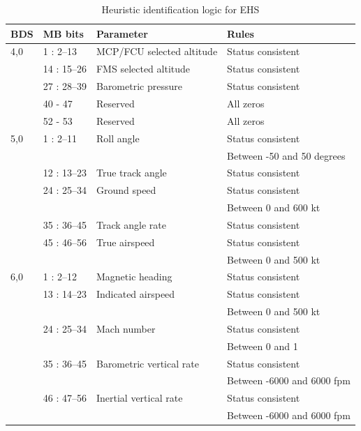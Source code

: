 \begin{table}
\footnotesize
\centering
\small
\caption{Heuristic identification logic for EHS}
\label{tb:bds_rule_ehs}
\begin{tabular}{|l|l|l|l|}
\hline
\textbf{BDS} & \textbf{MB bits} & \textbf{Parameter} & \textbf{Rules} \\ \hline \hline
4,0 & 1 : 2--13 & MCP/FCU selected altitude & Status consistent \\ \cline{2-4} 
& 14 : 15--26 & FMS selected altitude & Status consistent \\ \cline{2-4} 
& 27 : 28--39 & Barometric pressure & Status consistent \\ \cline{2-4} 
& 40 - 47 & Reserved & All zeros \\ \cline{2-4} 
& 52 - 53 & Reserved & All zeros \\ \hline \hline
5,0 & 1 : 2--11 & Roll angle & Status consistent \\ 
& & & Between -50 and 50 degrees \\ \cline{2-4} 
& 12 : 13--23 & True track angle & Status consistent \\ \cline{2-4} 
& 24 : 25--34 & Ground speed & Status consistent \\ 
& & & Between 0 and 600 kt \\ \cline{2-4} 
& 35 : 36--45 & Track angle rate & Status consistent \\ \cline{2-4} 
& 45 : 46--56 & True airspeed & Status consistent \\ 
& & & Between 0 and 500 kt \\ \hline \hline
6,0 & 1 : 2--12 & Magnetic heading & Status consistent \\ \cline{2-4} 
& 13 : 14--23 & Indicated airspeed & Status consistent \\ 
& & & Between 0 and 500 kt \\ \cline{2-4} 
& 24 : 25--34 & Mach number & Status consistent \\
& & & Between 0 and 1 \\ \cline{2-4} 
& 35 : 36--45 & Barometric vertical rate & Status consistent \\ 
& & & Between -6000 and 6000 fpm \\ \cline{2-4} 
& 46 : 47--56 & Inertial vertical rate & Status consistent \\ 
& & & Between -6000 and 6000 fpm \\ \hline
\end{tabular}
\end{table}


